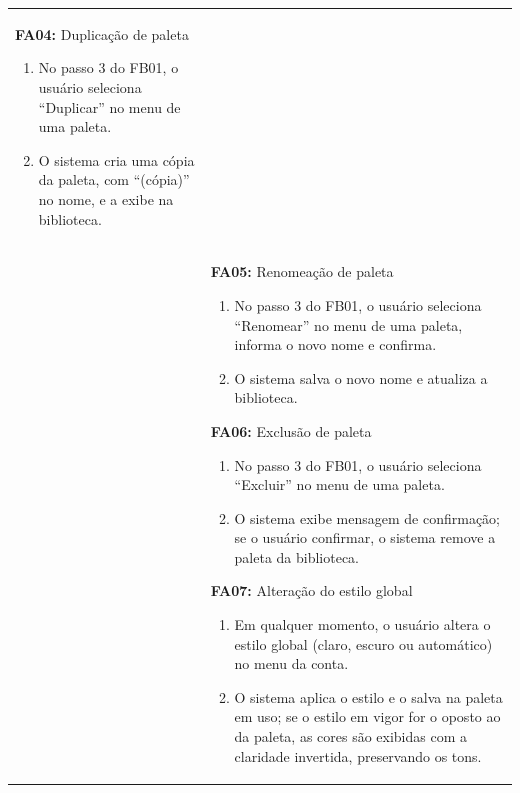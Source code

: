 \begin{longtable}{ >{\raggedright}p{2.8cm} | >{\raggedright\arraybackslash}p{10.7cm} }
\textbf{FA04:} Duplicação de paleta
\vspace{2pt}
\begin{enumerate}[nosep,leftmargin=1.2em,topsep=0pt,partopsep=0pt,parsep=0pt,itemsep=0pt,after=\vspace{2pt}]
    \item No passo 3 do FB01, o usuário seleciona ``Duplicar'' no menu de uma paleta.
    \item O sistema cria uma cópia da paleta, com ``(cópia)'' no nome, e a exibe na biblioteca.
\end{enumerate}
\mbox{} \\

 & \mbox{}
\textbf{FA05:} Renomeação de paleta
\vspace{2pt}
\begin{enumerate}[nosep,leftmargin=1.2em,topsep=0pt,partopsep=0pt,parsep=0pt,itemsep=0pt,after=\vspace{2pt}]
    \item No passo 3 do FB01, o usuário seleciona ``Renomear'' no menu de uma paleta, informa o novo nome e confirma.
    \item O sistema salva o novo nome e atualiza a biblioteca.
\end{enumerate}

\textbf{FA06:} Exclusão de paleta
\vspace{2pt}
\begin{enumerate}[nosep,leftmargin=1.2em,topsep=0pt,partopsep=0pt,parsep=0pt,itemsep=0pt,after=\vspace{2pt}]
    \item No passo 3 do FB01, o usuário seleciona ``Excluir'' no menu de uma paleta.
    \item O sistema exibe mensagem de confirmação; se o usuário confirmar, o sistema remove a paleta da biblioteca.
\end{enumerate}

\textbf{FA07:} Alteração do estilo global
\vspace{2pt}
\begin{enumerate}[nosep,leftmargin=1.2em,topsep=0pt,partopsep=0pt,parsep=0pt,itemsep=0pt,after=\vspace{2pt}]
    \item Em qualquer momento, o usuário altera o estilo global (claro, escuro ou automático) no menu da conta.
    \item O sistema aplica o estilo e o salva na paleta em uso; se o estilo em vigor for o oposto ao da paleta, as cores são exibidas com a claridade invertida, preservando os tons.
\end{enumerate}
\mbox{} \\


\end{longtable}
